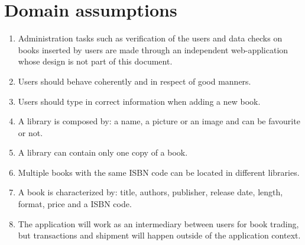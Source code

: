\section{Domain assumptions}
\begin{enumerate}
    \item Administration tasks such as verification of the users and data checks on books inserted by users are made through an independent web-application whose design is not part of this document.
    \item Users should behave coherently and in respect of good manners.
    \item Users should type in correct information when adding a new book.
    \item A library is composed by: a name, a picture or an image and can be favourite or not.    
    \item A library can contain only one copy of a book.
    \item Multiple books with the same ISBN code can be located in different libraries.
    \item A book is characterized by: title, authors, publisher, release date, length, format, price and a ISBN code.
    \item The application will work as an intermediary between users for book trading, but transactions and shipment will happen outside of the application context.
\end{enumerate}

